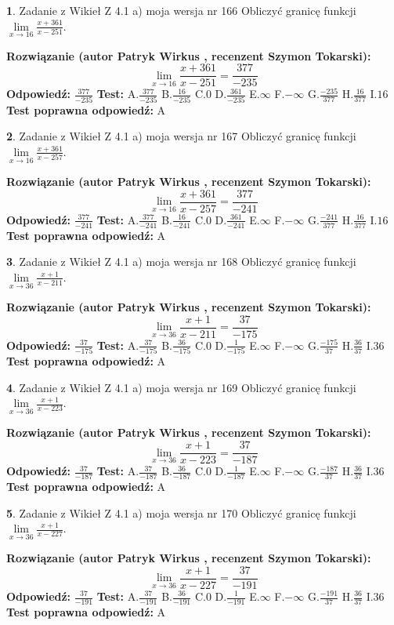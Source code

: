 \documentclass[12pt, a4paper]{article}
\theoremstyle{definition} %
\newtheorem{zad}{}
\newcommand{\zadStart}[1]{\begin{zad}#1\newline}
\newcommand{\zadStop}{\end{zad}}
\newcommand{\rozwStart}[2]{\noindent \textbf{Rozwiązanie (autor #1 , recenzent #2): }\newline}
\newcommand{\rozwStop}{\newline}
\newcommand{\odpStart}{\noindent \textbf{Odpowiedź:}\newline}
\newcommand{\odpStop}{\newline}
\newcommand{\testStart}{\noindent \textbf{Test:}\newline}
\newcommand{\testStop}{\newline}
\newcommand{\kluczStart}{\noindent \textbf{Test poprawna odpowiedź:}\newline}
\newcommand{\kluczStop}{\newline}
\begin{document}
\zadStart{Zadanie z Wikieł Z 4.1 a) moja wersja nr 166}
Obliczyć granicę funkcji $\lim\limits_{x\to16}\frac{x+361}{x-251}$.
\zadStop
\rozwStart{Patryk Wirkus}{Szymon Tokarski}
$$\lim\limits_{x\to16}\frac{x+361}{x-251} = \frac{377}{-235}$$
\rozwStop
\odpStart
$\frac{377}{-235}$
\odpStop
\testStart
A.$\frac{377}{-235}$
B.$\frac{16}{-235}$
C.$0$
D.$\frac{361}{-235}$
E.$\infty$
F.$-\infty$
G.$\frac{-235}{377}$
H.$\frac{16}{377}$
I.$16$
\testStop
\kluczStart
A
\kluczStop



\zadStart{Zadanie z Wikieł Z 4.1 a) moja wersja nr 167}
Obliczyć granicę funkcji $\lim\limits_{x\to16}\frac{x+361}{x-257}$.
\zadStop
\rozwStart{Patryk Wirkus}{Szymon Tokarski}
$$\lim\limits_{x\to16}\frac{x+361}{x-257} = \frac{377}{-241}$$
\rozwStop
\odpStart
$\frac{377}{-241}$
\odpStop
\testStart
A.$\frac{377}{-241}$
B.$\frac{16}{-241}$
C.$0$
D.$\frac{361}{-241}$
E.$\infty$
F.$-\infty$
G.$\frac{-241}{377}$
H.$\frac{16}{377}$
I.$16$
\testStop
\kluczStart
A
\kluczStop



\zadStart{Zadanie z Wikieł Z 4.1 a) moja wersja nr 168}
Obliczyć granicę funkcji $\lim\limits_{x\to36}\frac{x+1}{x-211}$.
\zadStop
\rozwStart{Patryk Wirkus}{Szymon Tokarski}
$$\lim\limits_{x\to36}\frac{x+1}{x-211} = \frac{37}{-175}$$
\rozwStop
\odpStart
$\frac{37}{-175}$
\odpStop
\testStart
A.$\frac{37}{-175}$
B.$\frac{36}{-175}$
C.$0$
D.$\frac{1}{-175}$
E.$\infty$
F.$-\infty$
G.$\frac{-175}{37}$
H.$\frac{36}{37}$
I.$36$
\testStop
\kluczStart
A
\kluczStop



\zadStart{Zadanie z Wikieł Z 4.1 a) moja wersja nr 169}
Obliczyć granicę funkcji $\lim\limits_{x\to36}\frac{x+1}{x-223}$.
\zadStop
\rozwStart{Patryk Wirkus}{Szymon Tokarski}
$$\lim\limits_{x\to36}\frac{x+1}{x-223} = \frac{37}{-187}$$
\rozwStop
\odpStart
$\frac{37}{-187}$
\odpStop
\testStart
A.$\frac{37}{-187}$
B.$\frac{36}{-187}$
C.$0$
D.$\frac{1}{-187}$
E.$\infty$
F.$-\infty$
G.$\frac{-187}{37}$
H.$\frac{36}{37}$
I.$36$
\testStop
\kluczStart
A
\kluczStop



\zadStart{Zadanie z Wikieł Z 4.1 a) moja wersja nr 170}
Obliczyć granicę funkcji $\lim\limits_{x\to36}\frac{x+1}{x-227}$.
\zadStop
\rozwStart{Patryk Wirkus}{Szymon Tokarski}
$$\lim\limits_{x\to36}\frac{x+1}{x-227} = \frac{37}{-191}$$
\rozwStop
\odpStart
$\frac{37}{-191}$
\odpStop
\testStart
A.$\frac{37}{-191}$
B.$\frac{36}{-191}$
C.$0$
D.$\frac{1}{-191}$
E.$\infty$
F.$-\infty$
G.$\frac{-191}{37}$
H.$\frac{36}{37}$
I.$36$
\testStop
\kluczStart
A
\kluczStop
\end{document}
